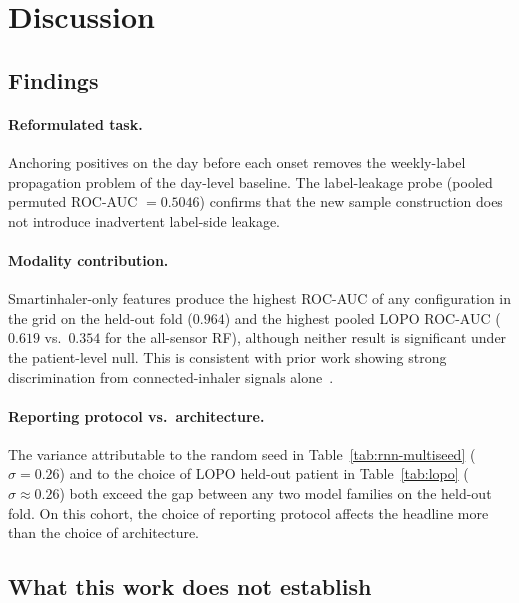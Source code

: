 \documentclass[11pt,a4paper]{article}
\newcommand{\rocauc}{ROC\nobreakdash-AUC}
\begin{document}
\section{Discussion}\label{sec:discussion}

\subsection{Findings}

\paragraph{Reformulated task.}
Anchoring positives on the day before each onset removes the
weekly-label propagation problem of the day-level baseline.  The
label-leakage probe (pooled permuted \rocauc{} $=0.5046$) confirms
that the new sample construction does not introduce inadvertent
label-side leakage.

\paragraph{Modality contribution.}
Smartinhaler-only features produce the highest \rocauc{} of any
configuration in the grid on the held-out fold ($0.964$) and the
highest pooled LOPO \rocauc{} ($0.619$ vs.\ $0.354$ for the
all-sensor RF), although neither result is significant under the
patient-level null.  This is consistent with prior work showing
strong discrimination from connected-inhaler signals
alone~\cite{lugogo2022}.

\paragraph{Reporting protocol vs.\ architecture.}
The variance attributable to the random seed in
Table~\ref{tab:rnn-multiseed} ($\sigma=0.26$) and to the choice of
LOPO held-out patient in Table~\ref{tab:lopo} ($\sigma\approx 0.26$)
both exceed the gap between any two model families on the held-out
fold.  On this cohort, the choice of reporting protocol affects
the headline more than the choice of architecture.

\subsection{What this work does not establish}
\end{document}
